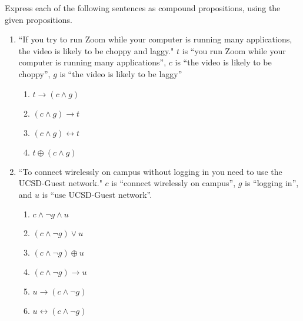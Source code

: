 
Express each of the following sentences as compound propositions, using
the given propositions.

\begin{enumerate}
\item ``If you try to run Zoom while your computer is running many applications,
the video is likely to be choppy and laggy." $t$ is ``you run Zoom while your
computer is running many applications'', $c$ is ``the video is likely to be choppy'',
$g$ is ``the video is likely to be laggy''
\begin{multicols}{2}
    \begin{enumerate}
    \item[] $t \to (c \land g)$
    \item[] $(c \land g) \to t$
    \item[] $(c \land g) \leftrightarrow t$
    \item[] $t \oplus (c \land g)$
\end{enumerate}
\end{multicols}
\item ``To connect wirelessly on campus without logging in you need to use
the UCSD-Guest network."  $c$ is ``connect wirelessly 
on campus'', $g$ is ``logging in'', and $u$ is ``use UCSD-Guest network''.
\begin{multicols}{2}
    \begin{enumerate}
    \item[] $c \land \lnot g \land u$
    \item[] $(c \land \lnot g) \lor u$
    \item[] $(c \land \lnot g) \oplus u$
    \item[] $(c \land \lnot g) \to u$
    \item[] $u \to (c \land \lnot g)$
    \item[] $u \leftrightarrow (c \land \lnot g)$
\end{enumerate}
\end{multicols}
\end{enumerate}
